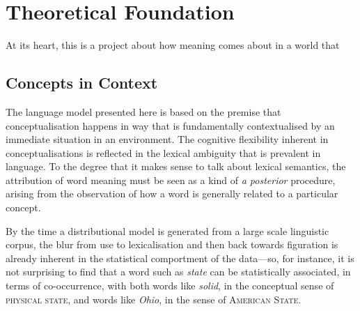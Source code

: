 \chapter{Theoretical Foundation}
At its heart, this is a project about how meaning comes about in a world that

\section{Concepts in Context}
The language model presented here is based on the premise that conceptualisation happens in way that is fundamentally contextualised by an immediate situation in an environment.  The cognitive flexibility inherent in conceptualisations is reflected in the lexical ambiguity that is prevalent in language.  To the degree that it makes sense to talk about lexical semantics, the attribution of word meaning must be seen as a kind of \emph{a posterior} procedure, arising from the observation of how a word is generally related to a particular concept.

By the time a distributional model is generated from a large scale linguistic corpus, the blur from use to lexicalisation and then back towards figuration is already inherent in the statistical comportment of the data---so, for instance, it is not surprising to find that a word such as \emph{state} can be statistically associated, in terms of co-occurrence, with both words like \emph{solid}, in the conceptual sense of \textsc{physical state}, and words like \emph{Ohio}, in the sense of \textsc{American State}.

